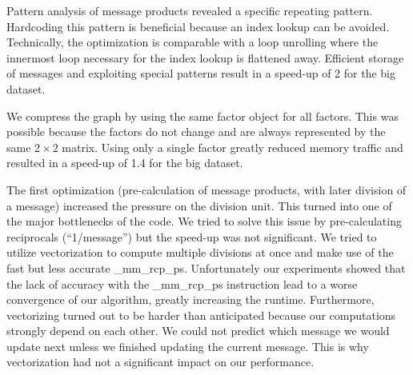 Pattern analysis of message products revealed a specific repeating pattern. Hardcoding this pattern is beneficial because an index lookup can be avoided. Technically, the optimization is comparable with a loop unrolling where the innermost loop necessary for the index lookup is flattened away.
Efficient storage of messages and exploiting special patterns result in a speed-up of 2 for the big dataset.

We compress the graph by using the same factor object for all factors. This was possible because the factors do not change and are always represented by the same $2\times2$ matrix. Using only a single factor greatly reduced memory traffic and resulted in a speed-up of 1.4 for the big dataset.

The first optimization (pre-calculation of message products, with later division of a message) increased the pressure on the division unit. This turned into one of the major bottlenecks of the code. We tried to solve this issue by pre-calculating reciprocals (“1/message”) but the speed-up was not significant. We tried to utilize vectorization to compute multiple divisions at once and make use of the fast but less accurate \_mm\_rcp\_ps. Unfortunately our experiments showed that the lack of accuracy with the \_mm\_rcp\_ps instruction lead to a worse convergence of our algorithm, greatly increasing the runtime. Furthermore, vectorizing turned out to be harder than anticipated because our computations strongly depend on each other. We could not predict which message we would update next unless we finished updating the current message. This is why vectorization had not a significant impact on our performance.



